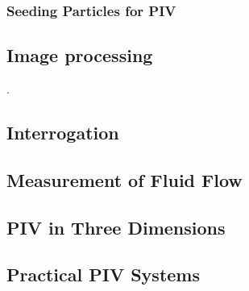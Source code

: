 \subsubsection{Seeding Particles for PIV}

\subsection{Image processing}

\cite{soloff1997, willert1997}.

\subsection{Interrogation}

\subsection{Measurement of Fluid Flow}

\subsection{PIV in Three Dimensions}

\subsection{Practical PIV Systems}


